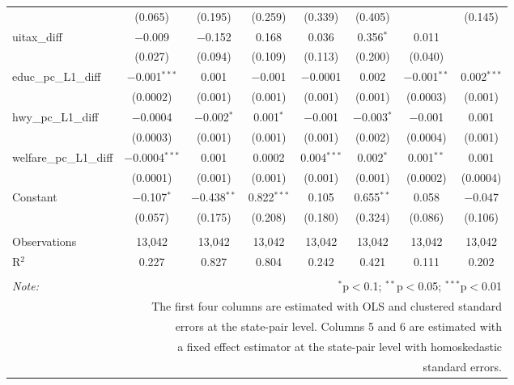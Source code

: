 \begin{table}[!htbp]
\begin{tabular}{@{\extracolsep{5pt}}lccccccc}
  & (0.065) & (0.195) & (0.259) & (0.339) & (0.405) &  & (0.145) \\ 
  uitax\_diff & $-$0.009 & $-$0.152 & 0.168 & 0.036 & 0.356$^{*}$ & 0.011 &  \\ 
  & (0.027) & (0.094) & (0.109) & (0.113) & (0.200) & (0.040) &  \\ 
  educ\_pc\_L1\_diff & $-$0.001$^{***}$ & 0.001 & $-$0.001 & $-$0.0001 & 0.002 & $-$0.001$^{**}$ & 0.002$^{***}$ \\ 
  & (0.0002) & (0.001) & (0.001) & (0.001) & (0.001) & (0.0003) & (0.001) \\ 
  hwy\_pc\_L1\_diff & $-$0.0004 & $-$0.002$^{*}$ & 0.001$^{*}$ & $-$0.001 & $-$0.003$^{*}$ & $-$0.001 & 0.001 \\ 
  & (0.0003) & (0.001) & (0.001) & (0.001) & (0.002) & (0.0004) & (0.001) \\ 
  welfare\_pc\_L1\_diff & $-$0.0004$^{***}$ & 0.001 & 0.0002 & 0.004$^{***}$ & 0.002$^{*}$ & 0.001$^{**}$ & 0.001 \\ 
  & (0.0001) & (0.001) & (0.001) & (0.001) & (0.001) & (0.0002) & (0.0004) \\ 
  Constant & $-$0.107$^{*}$ & $-$0.438$^{**}$ & 0.822$^{***}$ & 0.105 & 0.655$^{**}$ & 0.058 & $-$0.047 \\ 
  & (0.057) & (0.175) & (0.208) & (0.180) & (0.324) & (0.086) & (0.106) \\ 
 \hline \\[-1.8ex] 
Observations & 13,042 & 13,042 & 13,042 & 13,042 & 13,042 & 13,042 & 13,042 \\ 
R$^{2}$ & 0.227 & 0.827 & 0.804 & 0.242 & 0.421 & 0.111 & 0.202 \\ 
\hline 
\hline \\[-1.8ex] 
\textit{Note:}  & \multicolumn{7}{r}{$^{*}$p$<$0.1; $^{**}$p$<$0.05; $^{***}$p$<$0.01} \\ 
 & \multicolumn{7}{r}{The first four columns are estimated with OLS and clustered standard} \\ 
 & \multicolumn{7}{r}{ errors at the state-pair level. Columns 5 and 6 are estimated with} \\ 
 & \multicolumn{7}{r}{a fixed effect estimator at the state-pair level with homoskedastic} \\ 
 & \multicolumn{7}{r}{standard errors.} \\ 
\end{tabular} 
\end{table} 
